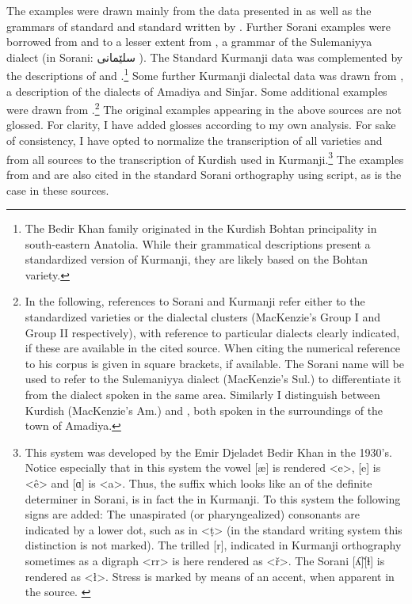 The examples were drawn mainly from the data presented in \citet{MacKenzie} as well as the grammars of standard \Kur and standard \Sor written by \citet{ThackstonKurmanji, ThackstonSorani}. Further Sorani examples were borrowed from \citet{BlauSorani} and to a lesser extent from \citet{AbdullaMcCarus}, a  grammar of the Sulemaniyya dialect (in Sorani: \textarabic{سلێمانی} ). The Standard Kurmanji data was complemented by the descriptions of \citet{BedirKhan} and \citet{BedirKhanLescot}.\footnote{The Bedir Khan family originated in the Kurdish Bohtan principality in south-eastern Anatolia. While their grammatical descriptions present a standardized version of Kurmanji, they are likely based on the Bohtan variety.} Some further Kurmanji dialectal data was drawn from \citet{BlauAmadiya}, a description of the dialects of Amadiya and Sinǰar. Some additional examples were drawn from \citet{SamvelianHead}.\footnote{In the following, references to Sorani and Kurmanji refer either to the standardized varieties or the dialectal clusters (MacKenzie's Group I and Group II respectively), with reference to particular dialects clearly indicated, if these are available in the cited source. When citing \citet{MacKenzie} the numerical reference to his corpus \citep{MacKenzieTexts} is given in square brackets, if available. The Sorani name  will be used to refer to the Sulemaniyya dialect (MacKenzie's Sul.) to differentiate it from the  dialect spoken in the same area. Similarly I distinguish between Kurdish  (MacKenzie's Am.) and  , both spoken in the surroundings of the town of Amadiya.} The original examples appearing in the above sources \citep[with the exception of][]{SamvelianHead} are not glossed. For clarity, I have added glosses according to my own analysis. For sake of consistency, I have opted to normalize the transcription of all varieties and from all sources to the  transcription of Kurdish used in Kurmanji.\footnote{This system was developed by the Emir Djeladet Bedir Khan in the 1930's. Notice especially that in this system the vowel [æ] is rendered <e>, [e] is <ê> and [ɑ] is <a>. Thus, the suffix  which looks like an  of the definite determiner  in Sorani, is in fact the  in Kurmanji. To this system the following signs are added: The unaspirated (or pharyngealized) consonants are indicated by a lower dot, such as in <ṭ> (in the standard writing system this distinction is not marked). The trilled [r], indicated in Kurmanji orthography sometimes as a digraph <rr> is here rendered as <ř>. The Sorani [ʎ]\~[ɬ] is rendered as <ł>. Stress is marked by means of an accent, when apparent in the source. \label{ft:Kur_transc} } The examples from \citet{ThackstonSorani} and \citet{BlauSorani} are also cited in the standard Sorani orthography using  script, as is the case in these sources.


